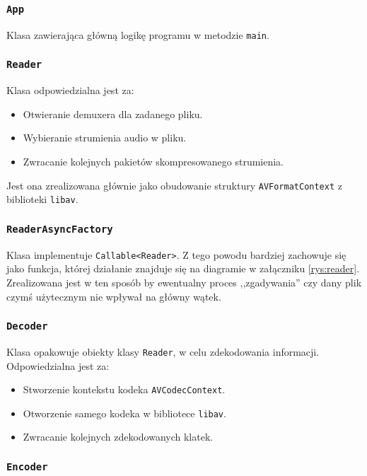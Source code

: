 \documentclass[a4paper,12pt]{article}
\begin{document}
\subsubsection{\texttt{App}}

Klasa zawierająca główną logikę programu w metodzie \texttt{main}.

\subsubsection{\texttt{Reader}}

Klasa odpowiedzialna jest za: 
\begin{itemize}
    \item Otwieranie demuxera dla zadanego pliku. 
    \item Wybieranie strumienia audio w pliku.
    \item Zwracanie kolejnych pakietów skompresowanego strumienia.
\end{itemize}

Jest ona zrealizowana głównie jako obudowanie struktury \texttt{AVFormatContext}
z biblioteki \texttt{libav}.

\subsubsection{\texttt{ReaderAsyncFactory}}

Klasa implementuje \texttt{Callable<Reader>}. Z tego powodu bardziej zachowuje
się jako funkcja, której działanie znajduje się na diagramie w załączniku
\ref{rys:reader}. Zrealizowana jest w ten sposób by ewentualny proces
,,zgadywania'' czy dany plik czymś użytecznym nie wpływał na główny wątek.

\subsubsection{\texttt{Decoder}}

Klasa opakowuje obiekty klasy \texttt{Reader}, w celu zdekodowania
informacji. Odpowiedzialna jest za: 
\begin{itemize}
    \item Stworzenie kontekstu kodeka \texttt{AVCodecContext}.
    \item Otworzenie samego kodeka w bibliotece \texttt{libav}.
    \item Zwracanie kolejnych zdekodowanych klatek.
\end{itemize}

\subsubsection{\texttt{Encoder}}
\end{document}
